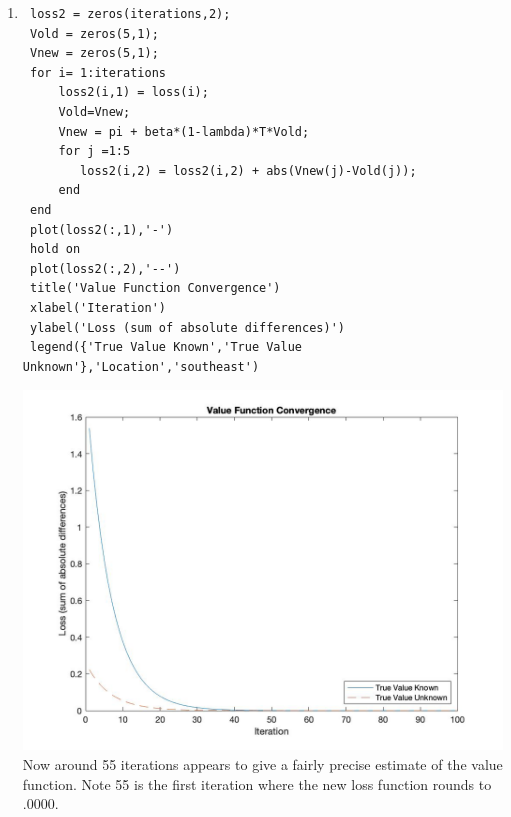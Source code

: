 \documentclass[12pt]{article}
\begin{document}
\begin{onehalfspace}
\begin{enumerate}[1.]
	\item
	\begin{lstlisting}
 loss2 = zeros(iterations,2);
 Vold = zeros(5,1);
 Vnew = zeros(5,1);
 for i= 1:iterations
     loss2(i,1) = loss(i);
     Vold=Vnew;
     Vnew = pi + beta*(1-lambda)*T*Vold;
     for j =1:5
        loss2(i,2) = loss2(i,2) + abs(Vnew(j)-Vold(j));
     end
 end
 plot(loss2(:,1),'-')
 hold on
 plot(loss2(:,2),'--')
 title('Value Function Convergence')
 xlabel('Iteration')
 ylabel('Loss (sum of absolute differences)')
 legend({'True Value Known','True Value Unknown'},'Location','southeast')
	\end{lstlisting}
	\includegraphics[width=\textwidth]{Econ_8307_PS2_4_4.jpg}
	Now around 55 iterations appears to give a fairly precise estimate of the value function. Note 55 is the first iteration where the new loss function rounds to .0000.
\end{enumerate}



\end{onehalfspace}
\end{document}
